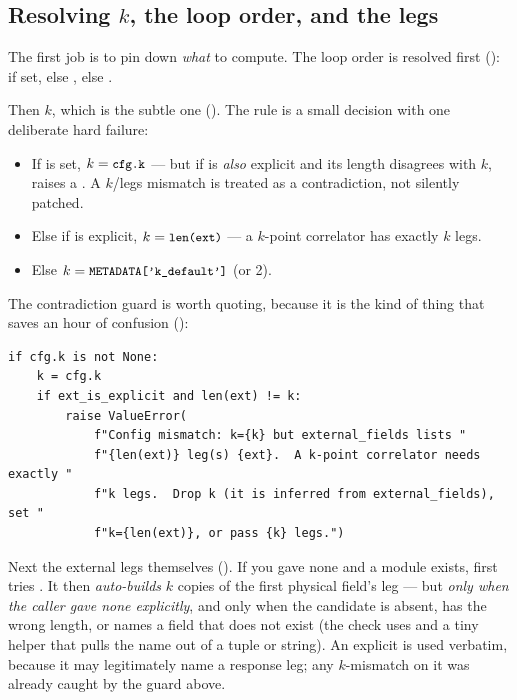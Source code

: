 \subsection{Resolving \texorpdfstring{$k$}{k}, the loop order, and the legs}

The first job is to pin down \emph{what} to compute. The loop order is resolved
first ():  if set, else
, else .

Then $k$, which is the subtle one (). The
rule is a small decision with one deliberate hard failure:

\begin{itemize}
  \item If  is set, $k=\texttt{\small cfg.k}$ --- but if 
        is \emph{also} explicit and its length disagrees with $k$, 
        raises a . A $k$/legs mismatch is treated as a
        contradiction, not silently patched.
  \item Else if  is explicit, $k = \texttt{\small len(ext)}$ --- a
        $k$-point correlator has exactly $k$ legs.
  \item Else $k = \texttt{\small METADATA['k\_default']}$ (or 2).
\end{itemize}

The contradiction guard is worth quoting, because it is the kind of thing that
saves an hour of confusion ():

\begin{lstlisting}
if cfg.k is not None:
    k = cfg.k
    if ext_is_explicit and len(ext) != k:
        raise ValueError(
            f"Config mismatch: k={k} but external_fields lists "
            f"{len(ext)} leg(s) {ext}.  A k-point correlator needs exactly "
            f"k legs.  Drop k (it is inferred from external_fields), set "
            f"k={len(ext)}, or pass {k} legs.")
\end{lstlisting}

Next the external legs themselves (). If you
gave none and a module exists,  first tries
. It then \emph{auto-builds} $k$
copies of the first physical field's leg  --- but \emph{only when
the caller gave none explicitly}, and only when the candidate is absent, has the
wrong length, or names a field that does not exist (the check uses
 and a tiny  helper that pulls the name out
of a tuple or string). An explicit  is used
verbatim, because it may legitimately name a response leg; any $k$-mismatch on it
was already caught by the guard above.

